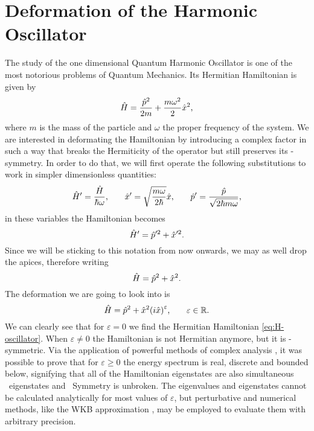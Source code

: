         \section{Deformation of the Harmonic Oscillator}\label{s:deformed-harmonic-oscillator}
            The study of the one dimensional Quantum Harmonic Oscillator is one of the most notorious problems of Quantum Mechanics. Its Hermitian Hamiltonian is given by
            \begin{equation}
                \hat{H} = \frac{\hat{p}^2}{2m} + \frac{m\omega^2}{2}\hat{x}^2\text{,}
            \end{equation}
            where $m$ is the mass of the particle and $\omega$ the proper frequency of the system. We are interested in deformating the Hamiltonian by introducing a complex factor in such a way that breaks the Hermiticity of the operator but still preserves its \PT-symmetry. In order to do that, we will first operate the following substitutions to work in simpler dimensionless quantities:
            \begin{equation}
                \hat{H}' = \frac{\hat{H}}{\hbar\omega}
                \text{,}\qquad
                \hat{x}' = \sqrt{\frac{m\omega}{2\hbar}}\hat{x}
                \text{,}\qquad
                \hat{p}' = \frac{\hat{p}}{\sqrt{2 \hbar m \omega}}
                \text{,}
            \end{equation}
            in these variables the Hamiltonian becomes
            \begin{equation*}
                \hat{H}' = \hat{p}'^2 + \hat{x}'^2
                \text{.}
            \end{equation*}
            Since we will be sticking to this notation from now onwards, we may as well drop the apices, therefore writing
            \begin{equation}
                \label{eq:H-oscillator}
                \hat{H} = \hat{p}^2 + \hat{x}^2
                \text{.}
            \end{equation}
            The deformation we are going to look into is
            \begin{equation}
                \hH = \hp^2 + \hx^2\pqty{i\hx}^\varepsilon
                \mycomma\qquad
                \varepsilon \in \bbR
                \myperiod
            \end{equation}
            We can clearly see that for $\varepsilon = 0$ we find the Hermitian Hamiltonian \eqref{eq:H-oscillator}. When $\varepsilon \neq 0$ the Hamiltonian is not Hermitian anymore, but it is \PT-symmetric. Via the application of powerful methods of complex analysis \cite{bender2024,Bender1998}, it was possible to prove that for $\varepsilon \geq 0$ the energy spectrum is real, discrete and bounded below, signifying that all of the Hamiltonian eigenstates are also simultaneous \hPT\ eigenstates and \PT\ Symmetry is unbroken. The eigenvalues and eigenstates cannot be calculated analytically for most values of $\varepsilon$, but perturbative and numerical methods, like the WKB approximation \cite{Bender2007}, may be employed to evaluate them with arbitrary precision.

